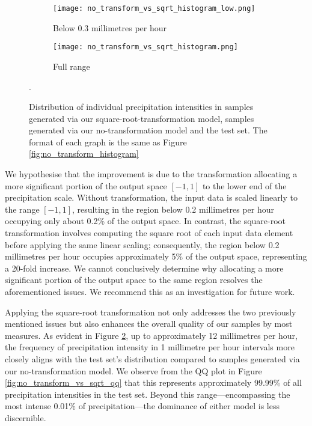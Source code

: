 \documentclass[ oneside,%
                    author={George Herbert},
                    degree={MSci},
                     title={Video Diffusion Models for Climate Simulations},
                  subtitle={}]{dissertation}
\begin{document}
\begin{figure}[htbp]
      \centering
      \begin{subfigure}{.49\textwidth}
            \texttt{[image: no\_transform\_vs\_sqrt\_histogram\_low.png]}
            \caption{Below 0.3 millimetres per hour}
            \label{fig:no_transform_vs_sqrt_histogram_low}
      \end{subfigure}
      \begin{subfigure}{.49\textwidth}
            \texttt{[image: no\_transform\_vs\_sqrt\_histogram.png]}
            \caption{Full range}
            \label{fig:no_transform_vs_sqrt_histogram_full}
      \end{subfigure}
      \caption{Distribution of individual precipitation intensities in samples generated via our square-root-transformation model, samples generated via our no-transformation model and the test set. The format of each graph is the same as Figure \ref{fig:no_transform_histogram}}.
      \label{fig:no_transform_vs_sqrt_histogram}
\end{figure}

We hypothesise that the improvement is due to the transformation allocating a more significant portion of the output space $[-1, 1]$ to the lower end of the precipitation scale. Without transformation, the input data is scaled linearly to the range $[-1, 1]$, resulting in the region below 0.2 millimetres per hour occupying only about 0.2\% of the output space. In contrast, the square-root transformation involves computing the square root of each input data element before applying the same linear scaling; consequently, the region below 0.2 millimetres per hour occupies approximately 5\% of the output space, representing a 20-fold increase. We cannot conclusively determine why allocating a more significant portion of the output space to the same region resolves the aforementioned issues. We recommend this as an investigation for future work.

Applying the square-root transformation not only addresses the two previously mentioned issues but also enhances the overall quality of our samples by most measures. As evident in Figure \ref{fig:no_transform_vs_sqrt_histogram_full}, up to approximately 12 millimetres per hour, the frequency of precipitation intensity in 1 millimetre per hour intervals more closely aligns with the test set's distribution compared to samples generated via our no-transformation model. We observe from the QQ plot in Figure \ref{fig:no_transform_vs_sqrt_qq} that this represents approximately 99.99\% of all precipitation intensities in the test set. Beyond this range---encompassing the most intense 0.01\% of precipitation---the dominance of either model is less discernible.
\end{document}
